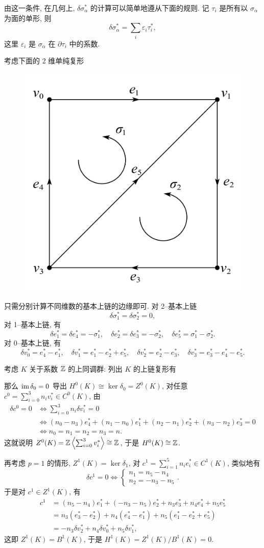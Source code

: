 由这一条件, 在几何上, $ \delta\sigma_\alpha^* $ 的计算可以简单地遵从下面的规则. 记 $ \tau_i $ 是所有以 $ \sigma_\alpha $ 为面的单形, 则
\[
	\delta\sigma_\alpha^*=\sum_{i}\varepsilon_i\tau_i^*,
\]
这里 $ \varepsilon_i $ 是 $ \sigma_\alpha $ 在 $ \partial\tau_i $ 中的系数.
\newpage
\begin{Example}\label{ex: 一个计算例子}
	考虑下面的 2 维单纯复形
	\begin{figure}[h]
		\centering
		\includegraphics[width=0.25\linewidth]{figures/Sec15-1.png}
	\end{figure}

	只需分别计算不同维数的基本上链的边缘即可. 对 2--基本上链
	\[
		\delta\sigma_1^*=\delta\sigma_2^*=0,
	\]
	对 1--基本上链, 有
	\[
		\delta e_1^*=\delta e_4^*=-\sigma_1^*,\quad \delta e_2^*=\delta e_3^*=-\sigma_2^*,\quad \delta e_5^*=\sigma_1^*-\sigma_2^*.
	\]
	对 0--基本上链, 有
	\[
		\delta v_0^*=e_4^*-e_1^*,\quad \delta v_1^*=e_1^*-e_2^*+e_5^*,\quad \delta v_2^*=e_2^*-e_3^*,\quad \delta v_3^*=e_3^*-e_4^*-e_5^*.
	\]

	考虑 $ K $ 关于系数 $ \mathbb{Z} $ 的上同调群: 列出 $ K $ 的上链复形有
	\begin{center}
	\end{center}
	那么 $ \mathrm{im}\,\delta_0=0 $ 导出 $ H^0(K)\cong\ker\delta_0=Z^0(K) $, 对任意 $ c^0=\sum_{i=0}^3n_iv_i^*\in C^0(K) $, 由
	\[
		\begin{aligned}
			\delta c^0=0&\Longleftrightarrow \sum_{i=0}^3n_i\delta v_i^*=0\\
			&\Longleftrightarrow (n_0-n_3)e_4^*+(n_1-n_0)e_1^*+(n_2-n_1)e_2^*+(n_3-n_2)e_3^*=0\\
			&\Longleftrightarrow n_0=n_1=n_2=n_3=n.
		\end{aligned}
	\]
	这就说明 $ Z^0(K)=\mathbb{Z}\left\langle \sum_{i=0}^3v_i^* \right\rangle\cong\mathbb{Z} $, 于是 $ H^0(K)\cong\mathbb{Z} $.

	再考虑 $ p=1 $ 的情形, $ Z^1(K)=\ker\delta_1 $, 对 $ c^1=\sum_{i=1}^5n_ie_i^*\in C^1(K) $, 类似地有
	\[
		\delta c^1=0\Longleftrightarrow\begin{cases}
			n_1=n_5-n_4\\ n_2=-n_3-n_5
		\end{cases}.
	\]
	于是对 $ c^1\in Z^1(K) $, 有
	\[
		\begin{aligned}
			c^1&=(n_5-n_4)e_1^*+(-n_3-n_5)e_2^*+n_3e_3^*+n_4e_4^*+n_5e_5^*\\
			&=n_3(e_3^*-e_2^*)+n_4(e_4^*-e_1^*)+n_5(e_1^*-e_2^*+e_5^*)\\
			&=-n_3\delta v_2^*+n_4\delta v_0^*+n_5\delta v_1^*,
		\end{aligned}
	\]
	这即 $ Z^1(K)=B^1(K) $, 于是 $ H^1(K)=Z^1(K)/B^1(K)=0 $.


\end{Example}
